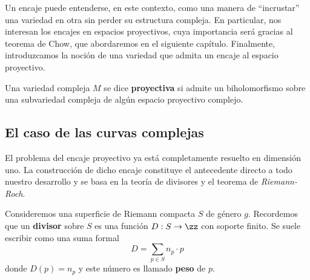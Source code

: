    	Un encaje puede entenderse, en este contexto, como una manera de \enquote{incrustar} una variedad en otra sin perder su estructura compleja. En particular, nos interesan los encajes en espacios proyectivos, cuya importancia será gracias al teorema de Chow, que abordaremos en el siguiente capítulo. Finalmente, introduzcamos la noción de una variedad que admita un encaje al espacio proyectivo.
   	
   	\begin{definition}
   		Una variedad compleja $M$ se dice \textbf{proyectiva} si admite un biholomorfismo sobre una subvariedad compleja de algún espacio proyectivo complejo.
   	\end{definition}
   	
   	\subsection{El caso de las curvas complejas}
   	
   	El problema del encaje proyectivo ya está completamente resuelto en dimensión uno. La construcción de dicho encaje constituye el antecedente directo a todo nuestro desarrollo y se basa en la teoría de divisores y el teorema de \textit{Riemann-Roch}.
   	
   	Consideremos una superficie de Riemann compacta $S$ de género $g$. Recordemos que un \textbf{divisor} sobre $S$ es una función $D:S\to \zz$ con soporte finito. Se suele escribir como una suma formal
   	\begin{equation*}
   		D=\sum_{p\in S} n_p\cdot p
   	\end{equation*}
   	donde $D(p)=n_p$ y este número es llamado \textbf{peso} de $p$.
   	

